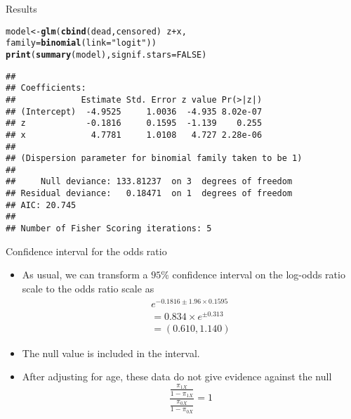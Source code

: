 \documentclass[10pt]{beamer}\usepackage[]{graphicx}\usepackage[]{color}
\makeatletter
\newcommand{\hlnum}[1]{\textcolor[rgb]{0.686,0.059,0.569}{#1}}%
\newcommand{\hlstr}[1]{\textcolor[rgb]{0.192,0.494,0.8}{#1}}%
\newcommand{\hlopt}[1]{\textcolor[rgb]{0,0,0}{#1}}%
\newcommand{\hlstd}[1]{\textcolor[rgb]{0.345,0.345,0.345}{#1}}%
\newcommand{\hlkwb}[1]{\textcolor[rgb]{0.69,0.353,0.396}{#1}}%
\newcommand{\hlkwc}[1]{\textcolor[rgb]{0.333,0.667,0.333}{#1}}%
\newcommand{\hlkwd}[1]{\textcolor[rgb]{0.737,0.353,0.396}{\textbf{#1}}}%
\newenvironment{kframe}{%
 \def\at@end@of@kframe{}%
 \ifinner\ifhmode%
  \def\at@end@of@kframe{\end{minipage}}%
  \begin{minipage}{\columnwidth}%
 \fi\fi%
 \def\FrameCommand##1{\hskip\@totalleftmargin \hskip-\fboxsep
 \colorbox{shadecolor}{##1}\hskip-\fboxsep
     \hskip-\linewidth \hskip-\@totalleftmargin \hskip\columnwidth}%
 \MakeFramed {\advance\hsize-\width
   \@totalleftmargin\z@ \linewidth\hsize
   \@setminipage}}%
 {\par\unskip\endMakeFramed%
 \at@end@of@kframe}
\newenvironment{knitrout}{}{} %
\makeatother
\begin{document}
\begin{frame}[fragile]{Results}
\begin{knitrout}
\color{fgcolor}\begin{kframe}
\begin{alltt}
\hlstd{model} \hlkwb{<-} \hlkwd{glm}\hlstd{(}\hlkwd{cbind}\hlstd{(dead,censored)} \hlopt{~} \hlstd{z} \hlopt{+} \hlstd{x,}
              \hlkwc{family}\hlstd{=}\hlkwd{binomial}\hlstd{(}\hlkwc{link}\hlstd{=}\hlstr{"logit"}\hlstd{))}
\hlkwd{print}\hlstd{(}\hlkwd{summary}\hlstd{(model),} \hlkwc{signif.stars} \hlstd{=} \hlnum{FALSE}\hlstd{)}
\end{alltt}
\begin{verbatim}
## 
## Coefficients:
##             Estimate Std. Error z value Pr(>|z|)
## (Intercept)  -4.9525     1.0036  -4.935 8.02e-07
## z            -0.1816     0.1595  -1.139    0.255
## x             4.7781     1.0108   4.727 2.28e-06
## 
## (Dispersion parameter for binomial family taken to be 1)
## 
##     Null deviance: 133.81237  on 3  degrees of freedom
## Residual deviance:   0.18471  on 1  degrees of freedom
## AIC: 20.745
## 
## Number of Fisher Scoring iterations: 5
\end{verbatim}
\end{kframe}
\end{knitrout}
\end{frame}



\begin{frame}[fragile]{Confidence interval for the odds ratio}
	\begin{itemize}
		\item As usual, we can transform a $95 \%$ confidence interval on the log-odds ratio scale to the odds ratio scale as
		$$
		\begin{array}{l}
		e^{-0.1816 \pm 1.96 \times 0.1595} \\
		=0.834 \times e^{\pm 0.313} \\
		=(0.610,1.140)
		\end{array}
		$$
		\item The null value is included in the interval.
		\item After adjusting for age, these data do not give evidence against the null
		$$
		\frac{\frac{\pi_{1 X}}{1-\pi_{1 X}}}{\frac{\pi_{0 X}}{1-\pi_{0 X}}}=1
		$$
	\end{itemize}
\end{frame}
\end{document}
